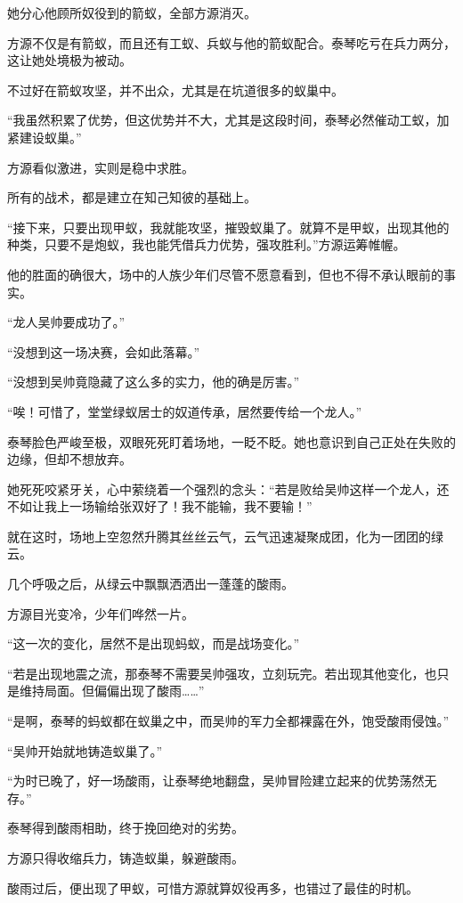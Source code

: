 \begin{this_body}
她分心他顾所奴役到的箭蚁，全部方源消灭。

方源不仅是有箭蚁，而且还有工蚁、兵蚁与他的箭蚁配合。泰琴吃亏在兵力两分，这让她处境极为被动。

不过好在箭蚁攻坚，并不出众，尤其是在坑道很多的蚁巢中。

“我虽然积累了优势，但这优势并不大，尤其是这段时间，泰琴必然催动工蚁，加紧建设蚁巢。”

方源看似激进，实则是稳中求胜。

所有的战术，都是建立在知己知彼的基础上。

“接下来，只要出现甲蚁，我就能攻坚，摧毁蚁巢了。就算不是甲蚁，出现其他的种类，只要不是炮蚁，我也能凭借兵力优势，强攻胜利。”方源运筹帷幄。

他的胜面的确很大，场中的人族少年们尽管不愿意看到，但也不得不承认眼前的事实。

“龙人吴帅要成功了。”

“没想到这一场决赛，会如此落幕。”

“没想到吴帅竟隐藏了这么多的实力，他的确是厉害。”

“唉！可惜了，堂堂绿蚁居士的奴道传承，居然要传给一个龙人。”

泰琴脸色严峻至极，双眼死死盯着场地，一眨不眨。她也意识到自己正处在失败的边缘，但却不想放弃。

她死死咬紧牙关，心中萦绕着一个强烈的念头：“若是败给吴帅这样一个龙人，还不如让我上一场输给张双好了！我不能输，我不要输！”

就在这时，场地上空忽然升腾其丝丝云气，云气迅速凝聚成团，化为一团团的绿云。

几个呼吸之后，从绿云中飘飘洒洒出一蓬蓬的酸雨。

方源目光变冷，少年们哗然一片。

“这一次的变化，居然不是出现蚂蚁，而是战场变化。”

“若是出现地震之流，那泰琴不需要吴帅强攻，立刻玩完。若出现其他变化，也只是维持局面。但偏偏出现了酸雨……”

“是啊，泰琴的蚂蚁都在蚁巢之中，而吴帅的军力全都裸露在外，饱受酸雨侵蚀。”

“吴帅开始就地铸造蚁巢了。”

“为时已晚了，好一场酸雨，让泰琴绝地翻盘，吴帅冒险建立起来的优势荡然无存。”

泰琴得到酸雨相助，终于挽回绝对的劣势。

方源只得收缩兵力，铸造蚁巢，躲避酸雨。

酸雨过后，便出现了甲蚁，可惜方源就算奴役再多，也错过了最佳的时机。


\end{this_body}
